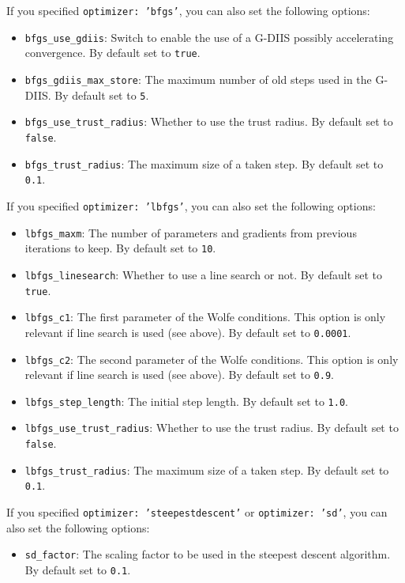 \documentclass[]{tufte-book}
\begin{document}
If you specified \texttt{optimizer: 'bfgs'}, you can also set the following options:
\begin{itemize}
\item \texttt{bfgs\_use\_gdiis}: Switch to enable the use of a G-DIIS possibly accelerating convergence. By default set to 
\texttt{true}.
\item \texttt{bfgs\_gdiis\_max\_store}: The maximum number of old steps used in the G-DIIS. By default set to \texttt{5}.
\item \texttt{bfgs\_use\_trust\_radius}: Whether to use the trust radius. By default set to \texttt{false}.
\item \texttt{bfgs\_trust\_radius}: The maximum size of a taken step. By default set to \texttt{0.1}.
\end{itemize}

If you specified \texttt{optimizer: 'lbfgs'}, you can also set the following options:
\begin{itemize}
\item \texttt{lbfgs\_maxm}: The number of parameters and gradients from previous iterations to keep. By default set to 
\texttt{10}.
\item \texttt{lbfgs\_linesearch}: Whether to use a line search or not. By default set to \texttt{true}.
\item \texttt{lbfgs\_c1}: The first parameter of the Wolfe conditions. This option is only relevant if line search is
used (see above). By default set to \texttt{0.0001}.
\item \texttt{lbfgs\_c2}:  The second parameter of the Wolfe conditions. This option is only relevant if line search is
used (see above). By default set to \texttt{0.9}.
\item \texttt{lbfgs\_step\_length}: The initial step length. By default set to \texttt{1.0}.
\item \texttt{lbfgs\_use\_trust\_radius}: Whether to use the trust radius. By default set to \texttt{false}.
\item \texttt{lbfgs\_trust\_radius}: The maximum size of a taken step. By default set to \texttt{0.1}.
\end{itemize}

If you specified \texttt{optimizer: 'steepestdescent'} or \texttt{optimizer: 'sd'}, you can also set the following options:
\begin{itemize}
\item \texttt{sd\_factor}: The scaling factor to be used in the steepest descent algorithm. By default set to \texttt{0.1}.
\end{itemize}
\end{document}
